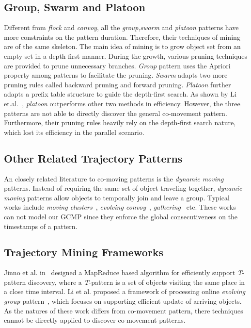 \subsection{Group, Swarm and Platoon}
Different from \emph{flock} and \emph{convoy}, all the \emph{group},\emph{swarm} and \emph{platoon}
patterns have more constraints on the pattern duration. Therefore, their techniques of mining are of
the same skeleton. The main idea of mining is to grow object set from an empty set
in a depth-first manner. During the growth, various pruning techniques are provided to prune 
unnecessary branches. \emph{Group} pattern uses the Apriori property among patterns to facilitate the pruning.
\emph{Swarm} adapts two more pruning rules called backward pruning and forward pruning. \emph{Platoon}
further adapts a prefix table structure to guide the depth-first search. As shown by Li et.al.~\cite{li2015platoon},
\emph{platoon} outperforms other two methods in efficiency. 
However, the three patterns are not able to directly discover the general co-movement pattern.
Furthermore, their pruning rules heavily rely on the depth-first search nature, which lost its efficiency
in the parallel scenario.

\subsection{Other Related Trajectory Patterns}
An closely related literature to co-moving patterns is the \emph{dynamic moving} patterns. Instead of requiring the same set of object traveling together, \emph{dynamic moving} patterns allow objects to temporally join and leave a group. Typical works include \emph{moving clusters}~\cite{kalnis2005movingclusters}, \emph{evolving convoy}~\cite{aung2010discovery}, \emph{gathering}~\cite{zheng2013gathering} etc. These works can not model our GCMP since they enforce the global consecutiveness on the timestamps of a pattern. 
\subsection{Trajectory Mining Frameworks}
Jinno et al. in~\cite{jinno2012paralleltpattern} designed a MapReduce based algorithm for efficiently support \emph{T}-pattern discovery, where a \emph{T}-pattern is a set of objects visiting the same place in a close time interval. Li et al. proposed a framework of processing online \emph{evolving group} pattern~\cite{li2013onlinegroup}, which focuses on supporting efficient update of arriving objects. 
As the natures of these work differs from co-movement pattern, there techniques cannot be directly applied to discover co-movement patterns.
